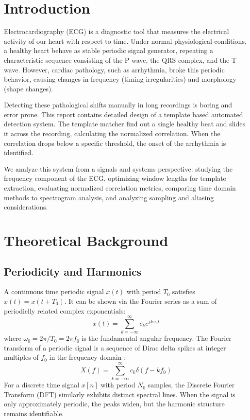 \documentclass[10pt, a4paper]{article}
\begin{document}
\section{Introduction}
Electrocardiography (ECG) is a diagnostic tool that measures the electrical activity of our heart with respect to time. Under normal physiological conditions, a healthy heart behave as stable periodic signal generator, repeating a characteristic sequence consisting of the P wave, the QRS complex, and the T wave. However, cardiac pathology, such as arrhythmia, broke this periodic behavior, causing changes in frequency (timing irregularities) and morphology (shape changes).

Detecting these pathological shifts manually in long recordings is boring and error prone. This report contains detailed design of a template based automated detection system. The template matcher find out a single healthy beat and slides it across the recording, calculating the normalized correlation. When the correlation drops below a specific threshold, the onset of the arrhythmia is identified. 

We analyze this system from a signals and systems perspective: studying the frequency component of the ECG, optimizing window lengths for template extraction, evaluating normalized correlation metrics, comparing time domain methods to spectrogram analysis, and analyzing sampling and aliasing considerations.
\section{Theoretical Background}

\subsection{Periodicity and Harmonics}
A continuous time periodic signal $x(t)$ with period $T_0$ satisfies $x(t) = x(t + T_0)$. It can be shown via the Fourier series as a sum of periodiclly related complex exponentials:
\begin{equation}
x(t) = \sum_{k=-\infty}^{\infty} c_k e^{j k \omega_0 t}
\end{equation}
where $\omega_0 = 2\pi/T_0 = 2\pi f_0$ is the fundamental angular frequency. The Fourier transform of a periodic signal is a sequence of Dirac delta spikes at integer multiples of $f_0$ in the frequency domain :
\begin{equation}
X(f) = \sum_{k=-\infty}^{\infty} c_k \delta(f - k f_0)
\end{equation}
For a discrete time signal $x[n]$ with period $N_0$ samples, the Discrete Fourier Transform (DFT) similarly exhibits distinct spectral lines. When the signal is only approximately periodic, the peaks widen, but the harmonic structure remains identifiable.
\end{document}
